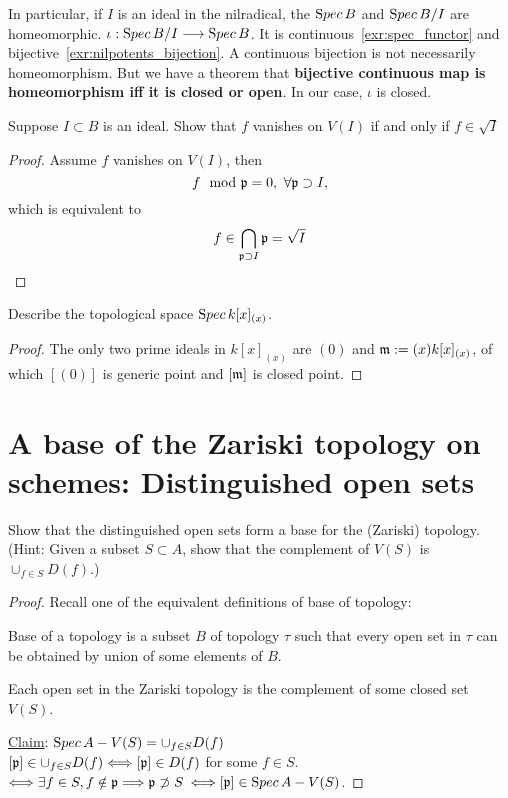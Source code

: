 \documentclass[11pt,fleqn]{book}
\begin{document}
\begin{remark}
In particular, if $I$ is an ideal in the nilradical, the ${\text Spec\,} B$ and ${\text Spec\,} B/I$ are homeomorphic. $\iota:{\text Spec\,} B/I\longrightarrow {\text Spec\,} B$. It is continuous~\ref{exr:spec_functor} and bijective~\ref{exr:nilpotents_bijection}.
A continuous bijection is not necessarily homeomorphism. But we have a theorem that \textbf{bijective continuous map is homeomorphism iff it is closed or open}. In our case, $\iota$ is closed. 
\end{remark}
\begin{exr}\label{exr:vanishing_set_radical}
Suppose $ I \subset B$ is an ideal. Show that $f$ vanishes on $V(I)$ if and only if $f \in \sqrt I$
\end{exr}
\begin{proof}
Assume $f$ vanishes on $V(I)$, then
$$
f\mod {{\mathfrak p}}=0,\ \forall  {\mathfrak p}\supset I,
$$
which is equivalent to 
$$
f\in \bigcap_{{\mathfrak p}\supset I}{\mathfrak p}=\sqrt{I}
$$

\end{proof}

\begin{exr}
Describe the topological space ${\text Spec\,} k[x]_{(x)}$.
\end{exr}
\begin{proof}
The only two prime ideals in $k[x]_{(x)}$ are $(0)$ and ${\mathfrak m}:=(x)k[x]_{(x)}$, of which $[(0)]$ is generic point and $[{\mathfrak m}]$ is closed point.
\end{proof}


\section{A base of the Zariski topology on schemes: Distinguished open sets}
\begin{exr}
Show that the distinguished open sets form a base for the (Zariski) topology. (Hint: Given a subset $ S \subset A$, show that the complement of $V(S)$ is $\cup_{f\in S}D(f).$)
\end{exr}
\begin{proof}
Recall one of the equivalent definitions of base of topology:

Base of a topology is a subset $B$ of topology $\tau$ such that every open set in $\tau$ can be obtained by union of some elements of $B$.

Each open set in the Zariski topology is the complement of some closed set $V(S)$.

\underline{Claim}: ${\text Spec\,} A-V(S)=\cup_{f\in S} D(f)$\\
$[{\mathfrak p}]\in \cup_{f\in S} D(f)\Longleftrightarrow [{\mathfrak p}]\in D(f)$ for some $f\in S$.\\
$ \Longleftrightarrow\exists f\in S, f\notin {\mathfrak p}\Longrightarrow {\mathfrak p}\not \supset S$ $\Longleftrightarrow [{\mathfrak p}]\in{\text Spec\,} A-V(S)$.
\end{proof}
\end{document}
